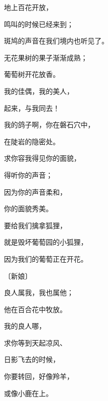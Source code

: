 {\par }{\Q {}地上百花开放，
\par }{鸣叫的时候已经来到；
\par }{\Q 斑鸠的声音在我们境内也听见了。
\par }{\Q {}无花果树的果子渐渐成熟；
\par }{\Q 葡萄树开花放香。
\par }{\Q 我的佳偶，我的美人，
\par }{\Q 起来，与我同去！
\par }{\Q {}我的鸽子啊，你在磐石穴中，
\par }{\Q 在陡岩的隐密处。
\par }{\Q 求你容我得见你的面貌，
\par }{\Q 得听你的声音；
\par }{\Q 因为你的声音柔和，
\par }{\Q 你的面貌秀美。
\par }{\Q {}要给我们擒拿狐狸，
\par }{\Q 就是毁坏葡萄园的小狐狸，
\par }{\Q 因为我们的葡萄正在开花。
\par }{\SP 〔新娘〕
\par }{\Q {}良人属我，我也属他；
\par }{\Q 他在百合花中牧放{}。
\par }{\Q {}我的良人哪，
\par }{\Q 求你等到天起凉风、
\par }{\Q 日影飞去的时候，
\par }{\Q 你要转回，好像羚羊，
\par }{\Q 或像小鹿在{}上。

}
